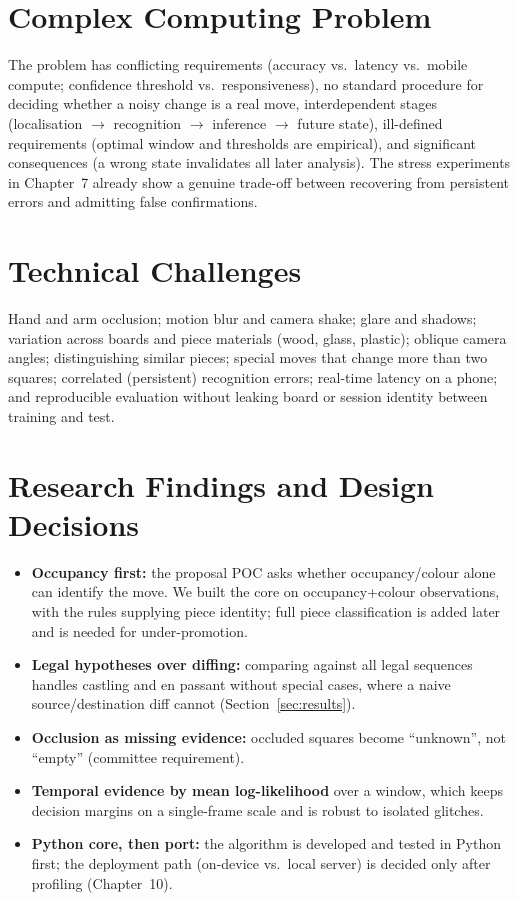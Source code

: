 \section{Complex Computing Problem}
The problem has conflicting requirements (accuracy vs.\ latency vs.\ mobile compute; confidence threshold vs.\
responsiveness), no standard procedure for deciding whether a noisy change is a real move, interdependent stages
(localisation $\to$ recognition $\to$ inference $\to$ future state), ill-defined requirements (optimal window and
thresholds are empirical), and significant consequences (a wrong state invalidates all later analysis). The stress
experiments in Chapter~7 already show a genuine trade-off between recovering from persistent errors and
admitting false confirmations.

\section{Technical Challenges}
Hand and arm occlusion; motion blur and camera shake; glare and shadows; variation across boards and piece
materials (wood, glass, plastic); oblique camera angles; distinguishing similar pieces; special moves that change
more than two squares; correlated (persistent) recognition errors; real-time latency on a phone; and
reproducible evaluation without leaking board or session identity between training and test.

\section{Research Findings and Design Decisions}
\begin{itemize}
\item \textbf{Occupancy first:} the proposal POC asks whether occupancy/colour alone can identify the move. We built the core on occupancy+colour observations, with the rules supplying piece identity; full piece classification is added later and is needed for under-promotion.
\item \textbf{Legal hypotheses over diffing:} comparing against all legal sequences handles castling and en passant without special cases, where a naive source/destination diff cannot (Section~\ref{sec:results}).
\item \textbf{Occlusion as missing evidence:} occluded squares become ``unknown'', not ``empty'' (committee requirement).
\item \textbf{Temporal evidence by mean log-likelihood} over a window, which keeps decision margins on a single-frame scale and is robust to isolated glitches.
\item \textbf{Python core, then port:} the algorithm is developed and tested in Python first; the deployment path (on-device vs.\ local server) is decided only after profiling (Chapter~10).
\end{itemize}
